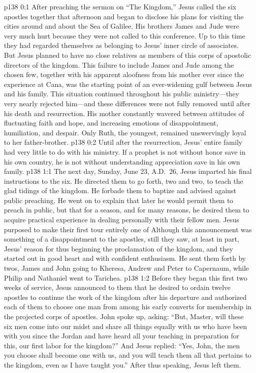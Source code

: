 \author{Midwayer Commission}
\vs p138 0:1 After preaching the sermon on “The Kingdom,” Jesus called the six apostles together that afternoon and began to disclose his plans for visiting the cities around and about the Sea of Galilee. His brothers James and Jude were very much hurt because they were not called to this conference. Up to this time they had regarded themselves as belonging to Jesus’ inner circle of associates. But Jesus planned to have no close relatives as members of this corps of apostolic directors of the kingdom. This failure to include James and Jude among the chosen few, together with his apparent aloofness from his mother ever since the experience at Cana, was the starting point of an ever\hyp{}widening gulf between Jesus and his family. This situation continued throughout his public ministry---they very nearly rejected him---and these differences were not fully removed until after his death and resurrection. His mother constantly wavered between attitudes of fluctuating faith and hope, and increasing emotions of disappointment, humiliation, and despair. Only Ruth, the youngest, remained unswervingly loyal to her father\hyp{}brother.
\vs p138 0:2 Until after the resurrection, Jesus’ entire family had very little to do with his ministry. If a prophet is not without honor save in his own country, he is not without understanding appreciation save in his own family.\plusone
{}
\vs p138 1:1 The next day, Sunday, June 23, A.D.~26, Jesus imparted his final instructions to the six. He directed them to go forth, two and two, to teach the glad tidings of the kingdom. He forbade them to baptize and advised against public preaching. He went on to explain that later he would permit them to preach in public, but that for a season, and for many reasons, he desired them to acquire practical experience in dealing personally with their fellow men. Jesus purposed to make their first tour entirely one of  Although this announcement was something of a disappointment to the apostles, still they saw, at least in part, Jesus’ reason for thus beginning the proclamation of the kingdom, and they started out in good heart and with confident enthusiasm. He sent them forth by twos, James and John going to Kheresa, Andrew and Peter to Capernaum, while Philip and Nathaniel went to Tarichea.
\vs p138 1:2 Before they began this first two weeks of service, Jesus announced to them that he desired to ordain twelve apostles to continue the work of the kingdom after his departure and authorized each of them to choose one man from among his early converts for membership in the projected corps of apostles. John spoke up, asking: “But, Master, will these six men come into our midst and share all things equally with us who have been with you since the Jordan and have heard all your teaching in preparation for this, our first labor for the kingdom?” And Jesus replied: \textcolor{ubdarkred}{“Yes, John, the men you choose shall become one with us, and you will teach them all that pertains to the kingdom, even as I have taught you.”} After thus speaking, Jesus left them.
